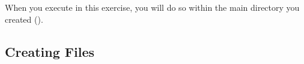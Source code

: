 When you execute \RevBayes in this exercise, you will do so within the main directory you created ().


%
%

\bigskip

\subsection{Creating \Rev Files}\label{subsect:RB-CreatingFiles}

